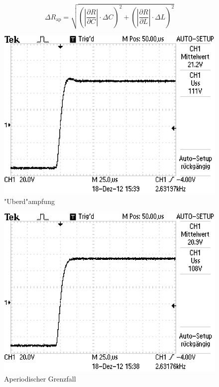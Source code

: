 	\begin{equation}
		\Delta R_\mathrm{ap} = \sqrt{ \left( |\frac{\partial R}{\partial C}| \cdot \Delta C \right)^2 + \left( |\frac{\partial R}{\partial L}| \cdot \Delta L \right)^2}
	\end{equation}
\clearpage
	\begin{figure}[H]
			\centering
			\includegraphics[width = 12cm]{img/F0003TEK.jpg}
			\caption{"Uberd"ampfung}
			\label{ap_1}
		\end{figure}	

		\begin{figure}[H]
			\centering
			\includegraphics[width = 12cm]{img/F0002TEK.jpg}
			\caption{Aperiodischer Grenzfall}
			\label{ap_2}
		\end{figure}

